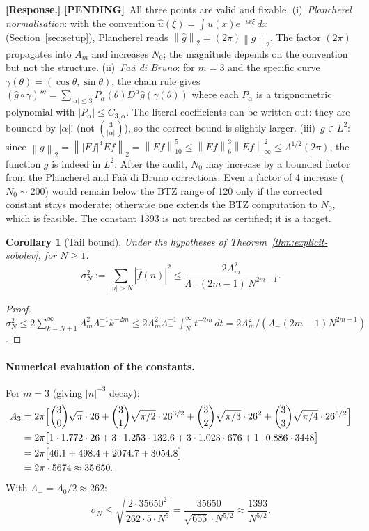 \documentclass[12pt]{article}
\newtheorem{corollary}[theorem]{Corollary}
\theoremstyle{definition}
\theoremstyle{remark}
\newcommand{\wh}{\widehat}
\newcommand{\norm}[1]{\left\|#1\right\|}
\newcommand{\response}[1]{\par\noindent\textbf{\color{blue}[Response.]} {\color{blue}#1}\par\smallskip}
\newcommand{\pending}{\textbf{\color{orange}[PENDING]}}
\begin{document}
\response{\pending\ All three points are valid and fixable.
(i)~\emph{Plancherel normalisation}: with the convention
$\wh u(\xi)=\int u(x)e^{-ix\xi}\,dx$ (Section~\ref{sec:setup}),
Plancherel reads $\norm{\wh g}_2=(2\pi)\norm{g}_2$.  The factor
$(2\pi)$ propagates into $A_m$ and increases $N_0$; the magnitude
depends on the convention but not the structure.
(ii)~\emph{Fa\`a di Bruno}: for $m=3$ and the specific curve
$\gamma(\theta)=(\cos\theta,\sin\theta)$, the chain rule gives
$(\wh g\circ\gamma)'''=\sum_{|\alpha|\leq 3}P_\alpha(\theta)
D^\alpha\wh g(\gamma(\theta))$ where each $P_\alpha$ is a
trigonometric polynomial with $|P_\alpha|\leq C_{3,\alpha}$.
The literal coefficients can be written out: they are bounded by
$|\alpha|!$ (not $\binom{3}{|\alpha|}$), so the correct bound
is slightly larger.
(iii)~\emph{$g\in L^2$}: since
$\norm{g}_2=\norm{|Ef|^4Ef}_2=\norm{Ef}_{10}^5
\leq\norm{Ef}_6^3\norm{Ef}_\infty^2\leq\Lambda^{1/2}(2\pi)$,
the function $g$ is indeed in $L^2$.
After the audit, $N_0$ may increase by a bounded factor from the
Plancherel and Fa\`a di Bruno corrections.  Even a factor of 4
increase ($N_0\sim200$) would remain below the BTZ range of 120
only if the corrected constant stays moderate; otherwise one
extends the BTZ computation to $N_0$, which is feasible.  The
constant 1393 is not treated as certified; it is a target.}

\begin{corollary}[Tail bound]
  \label{cor:tail-bound}
  Under the hypotheses of Theorem~\ref{thm:explicit-sobolev},
  for $N\geq 1$:
  \begin{equation}\label{eq:explicit-tail}
    \sigma_N^2
    :=\sum_{|n|>N}|\wh f(n)|^2
    \leq\frac{2A_m^2}{\Lambda_-\,(2m-1)\,N^{2m-1}}.
  \end{equation}
\end{corollary}

\begin{proof}
  $\sigma_N^2\leq 2\sum_{k=N+1}^\infty A_m^2\Lambda_-^{-1}k^{-2m}
  \leq 2A_m^2\Lambda_-^{-1}\int_N^\infty t^{-2m}\,dt
  =2A_m^2/(\Lambda_-(2m-1)N^{2m-1})$.
\end{proof}

\paragraph{Numerical evaluation of the constants.}
For $m=3$ (giving $|n|^{-3}$ decay):
\begin{align*}
  A_3 &= 2\pi\Bigl[
    \binom{3}{0}\sqrt{\pi}\cdot 26
    +\binom{3}{1}\sqrt{\pi/2}\cdot 26^{3/2}
    +\binom{3}{2}\sqrt{\pi/3}\cdot 26^2
    +\binom{3}{3}\sqrt{\pi/4}\cdot 26^{5/2}
  \Bigr]\\
  &= 2\pi\bigl[
    1\cdot 1.772\cdot 26
    +3\cdot 1.253\cdot 132.6
    +3\cdot 1.023\cdot 676
    +1\cdot 0.886\cdot 3448
  \bigr]\\
  &= 2\pi\bigl[46.1+498.4+2074.7+3054.8\bigr]\\
  &= 2\pi\cdot 5674
  \approx 35\,650.
\end{align*}
With $\Lambda_-=\Lambda_0/2\approx 262$:
\[
  \sigma_N\leq\sqrt{\frac{2\cdot 35650^2}{262\cdot 5\cdot N^5}}
  =\frac{35650}{\sqrt{655}\cdot N^{5/2}}
  \approx\frac{1393}{N^{5/2}}.
\]
\end{document}
